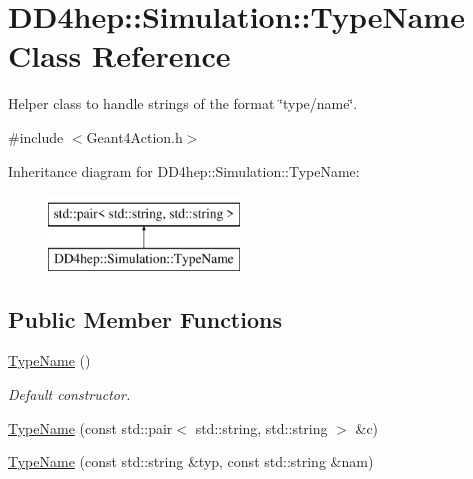 \hypertarget{class_d_d4hep_1_1_simulation_1_1_type_name}{}\section{D\+D4hep\+:\+:Simulation\+:\+:Type\+Name Class Reference}
\label{class_d_d4hep_1_1_simulation_1_1_type_name}


Helper class to handle strings of the format \char`\"{}type/name\char`\"{}.  




{\ttfamily \#include $<$Geant4\+Action.\+h$>$}

Inheritance diagram for D\+D4hep\+:\+:Simulation\+:\+:Type\+Name\+:\begin{figure}[H]
\begin{center}
\leavevmode
\includegraphics[height=2.000000cm]{class_d_d4hep_1_1_simulation_1_1_type_name}
\end{center}
\end{figure}
\subsection*{Public Member Functions}
\begin{DoxyCompactItemize}
\item 
\hyperlink{class_d_d4hep_1_1_simulation_1_1_type_name_acd01167ff15a1321cad0d90772911865}{Type\+Name} ()
\begin{DoxyCompactList}\small\item\em Default constructor. \end{DoxyCompactList}\item 
\hyperlink{class_d_d4hep_1_1_simulation_1_1_type_name_ad33e6295683ae918b2ea2daad18b7917}{Type\+Name} (const std\+::pair$<$ std\+::string, std\+::string $>$ \&c)
\item 
\hyperlink{class_d_d4hep_1_1_simulation_1_1_type_name_a2d20b1a7a7d29a660d2fb3a7f471a78d}{Type\+Name} (const std\+::string \&typ, const std\+::string \&nam)
\end{DoxyCompactItemize}
